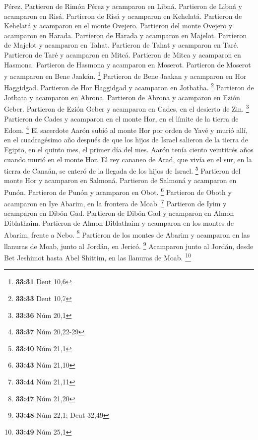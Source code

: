Pérez.  Partieron de Rimón Pérez y acamparon en Libná.
 Partieron de Libná y acamparon en Risá. 
Partieron de Risá y acamparon en Kehelatá.  Partieron de
Kehelatá y acamparon en el monte Ovejero.  Partieron del
monte Ovejero y acamparon en Harada.  Partieron de Harada
y acamparon en Majelot.  Partieron de Majelot y acamparon
en Tahat.  Partieron de Tahat y acamparon en Taré.
 Partieron de Taré y acamparon en Mitcá. 
Partieron de Mitca y acamparon en Hasmona.  Partieron de
Hasmona y acamparon en Moserot.  Partieron de Moserot y
acamparon en Bene Jaakán. \footnote{\textbf{33:31} Deut 10,6}
 Partieron de Bene Jaakan y acamparon en Hor Haggidgad.
 Partieron de Hor Haggidgad y acamparon en Jotbatha.
\footnote{\textbf{33:33} Deut 10,7}  Partieron de Jotbata
y acamparon en Abrona.  Partieron de Abrona y acamparon
en Ezión Geber.  Partieron de Ezión Geber y acamparon en
Cades, en el desierto de Zin. \footnote{\textbf{33:36} Núm 20,1}
 Partieron de Cades y acamparon en el monte Hor, en el
límite de la tierra de Edom. \footnote{\textbf{33:37} Núm 20,22-29}
 El sacerdote Aarón subió al monte Hor por orden de Yavé
y murió allí, en el cuadragésimo año después de que los hijos de Israel
salieron de la tierra de Egipto, en el quinto mes, el primer día del
mes.  Aarón tenía ciento veintitrés años cuando murió en
el monte Hor.  El rey cananeo de Arad, que vivía en el
sur, en la tierra de Canaán, se enteró de la llegada de los hijos de
Israel. \footnote{\textbf{33:40} Núm 21,1}  Partieron del
monte Hor y acamparon en Salmoná.  Partieron de Salmoná y
acamparon en Punón.  Partieron de Punón y acamparon en
Obot. \footnote{\textbf{33:43} Núm 21,10}  Partieron de
Oboth y acamparon en Iye Abarim, en la frontera de Moab. \footnote{\textbf{33:44}
  Núm 21,11}  Partieron de Iyim y acamparon en Dibón Gad.
 Partieron de Dibón Gad y acamparon en Almon Diblathaim.
 Partieron de Almon Diblathaim y acamparon en los montes
de Abarim, frente a Nebo. \footnote{\textbf{33:47} Núm 21,20}
 Partieron de los montes de Abarim y acamparon en las
llanuras de Moab, junto al Jordán, en Jericó. \footnote{\textbf{33:48}
  Núm 22,1; Deut 32,49}  Acamparon junto al Jordán, desde
Bet Jeshimot hasta Abel Shittim, en las llanuras de Moab. \footnote{\textbf{33:49}
  Núm 25,1}

